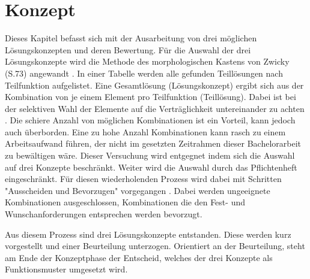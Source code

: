\newpage
\section{Konzept}
Dieses Kapitel befasst sich mit der Ausarbeitung von drei möglichen Lösungskonzepten und deren Bewertung. Für die Auswahl der drei Lösungskonzepte wird die Methode des morphologischen Kastens von Zwicky (S.73) angewandt \cite{naefe}. In einer Tabelle werden alle gefunden Teillösungen nach Teilfunktion aufgelistet. Eine Gesamtlösung (Lösungskonzept) ergibt sich aus der Kombination von je einem Element pro Teilfunktion (Teillösung). Dabei ist bei der selektiven Wahl der Elemente auf die Verträglichkeit untereinander zu achten \cite{naefe}.
\newline
Die schiere Anzahl von möglichen Kombinationen ist ein Vorteil, kann jedoch auch überborden. Eine zu hohe Anzahl Kombinationen kann rasch zu einem Arbeitsaufwand führen, der nicht im gesetzten Zeitrahmen dieser Bachelorarbeit zu bewältigen wäre. Dieser Versuchung wird entgegnet indem sich die Auswahl auf drei Konzepte beschränkt. Weiter wird die Auswahl durch das Pflichtenheft eingeschränkt. Für diesen wiederholenden Prozess wird dabei mit Schritten "Ausscheiden und Bevorzugen" vorgegangen \cite{naefe}. Dabei werden ungeeignete Kombinationen ausgeschlossen, Kombinationen die den Fest- und Wunschanforderungen entsprechen werden bevorzugt.

Aus diesem Prozess sind drei Lösungskonzepte entstanden. Diese werden kurz vorgestellt und einer Beurteilung unterzogen. Orientiert an der Beurteilung, steht am Ende der Konzeptphase der Entscheid, welches der drei Konzepte als Funktionsmuster umgesetzt wird.
